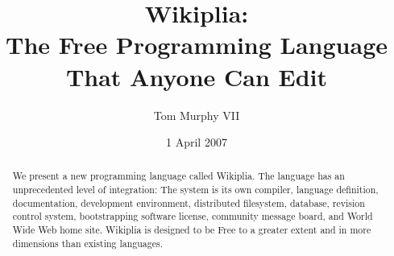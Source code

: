 \documentclass[twocolumn]{article}
\begin{document}
\newcommand\currentrevision{532}
\newcommand\currentsizekb{250}
\newcommand\wikipliaurl{http://wikiplia.spacebar.org:2222/}

\newcommand\ftinker{\ensuremath{\copyright}}
\newcommand\fexpression{\ensuremath{\hbar}}
\newcommand\fbeer{\ensuremath{\triangle}}
\newcommand\fusa{\ensuremath{\sqrt[x^{1.2}]{\mbox{\t{oo}} + \frac{x}{z^2}}}}
\newcommand\ffree{\ensuremath{\P}}
\newcommand\ftobe{{\tiny \ensuremath{\stackrel{\bigcirc}{\amalg}}}}

\newcommand\wcite[1]{\footnote{\tiny Wikipedia, the free encyclopedia: {\it #1}; 2007}}
\newcommand\wciteshort[1]{\footnote{\tiny Wikipedia, the free encyclopedia: {\it #1}}}
\newcommand\comment[1]{}
\newcommand\z{\ensuremath{\!}}

\newcommand\D\Delta
\newcommand\G\Gamma
\newcommand\m\mapsto
\newcommand\eval{{\sf eval\,\,}}
\newcommand\tag[2]{{\tt{\mbox{\tt <}}{#1}{\mbox{\tt>}}}{#2}{\tt{\mbox{\tt</}}{#1}{\mbox{\tt>}}}}
\newcommand\prim{{\,\,\sf prim}}
\newcommand\rate{{\sf rate\,\,}}

\newcommand\lb{\ensuremath{[\![}}
\newcommand\rb{\ensuremath{]\!]}}

\title{{\bf \huge Wikiplia}:\\
       The Free Programming Language\\
       That Anyone Can Edit}

\author{Tom Murphy VII}
\date{1 April 2007}

\maketitle

\begin{abstract}
We present a new programming language called Wikiplia. The language
has an unprecedented level of integration: The system is its own
compiler, language definition, documentation, development environment,
distributed filesystem, database, revision control system,
bootstrapping software license, community message board, and World
Wide Web home site. Wikiplia is designed to be Free to a greater
extent and in more dimensions than existing languages.
\end{abstract}

\end{document}
